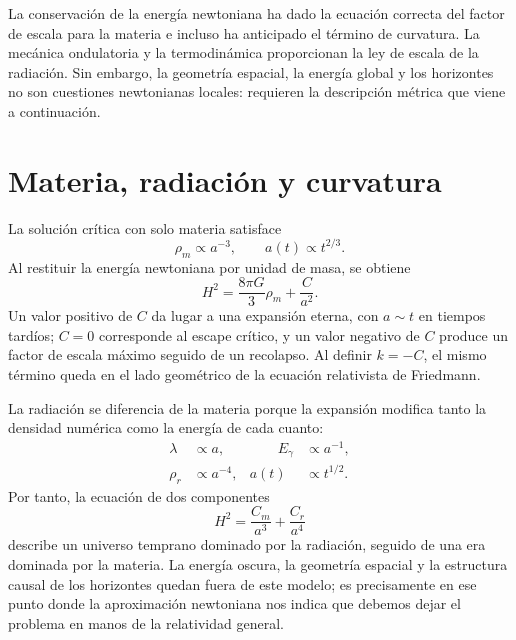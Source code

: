 La conservación de la energía newtoniana ha dado la ecuación correcta del factor de escala para la materia e incluso ha anticipado el término de curvatura. La mecánica ondulatoria y la termodinámica proporcionan la ley de escala de la radiación. Sin embargo, la geometría espacial, la energía global y los horizontes no son cuestiones newtonianas locales: requieren la descripción métrica que viene a continuación.

\section{Materia, radiación y curvatura}

La solución crítica con solo materia satisface
\begin{equation}
\rho_m\propto a^{-3},
\qquad
a(t)\propto t^{2/3}.
\end{equation}
Al restituir la energía newtoniana por unidad de masa, se obtiene
\begin{equation}
H^2=\frac{8\pi G}{3}\rho_m+\frac{C}{a^2}.
\end{equation}
Un valor positivo de \(C\) da lugar a una expansión eterna, con \(a\sim t\) en tiempos tardíos; \(C=0\) corresponde al escape crítico, y un valor negativo de \(C\) produce un factor de escala máximo seguido de un recolapso. Al definir \(k=-C\), el mismo término queda en el lado geométrico de la ecuación relativista de Friedmann.

La radiación se diferencia de la materia porque la expansión modifica tanto la densidad numérica como la energía de cada cuanto:
\begin{equation}
\begin{aligned}
\lambda&\propto a,
&\qquad E_\gamma&\propto a^{-1},\\
\rho_r&\propto a^{-4},
& a(t)&\propto t^{1/2}.
\end{aligned}
\end{equation}
Por tanto, la ecuación de dos componentes
\begin{equation}
H^2=\frac{C_m}{a^3}+\frac{C_r}{a^4}
\end{equation}
describe un universo temprano dominado por la radiación, seguido de una era dominada por la materia. La energía oscura, la geometría espacial y la estructura causal de los horizontes quedan fuera de este modelo; es precisamente en ese punto donde la aproximación newtoniana nos indica que debemos dejar el problema en manos de la relatividad general.
